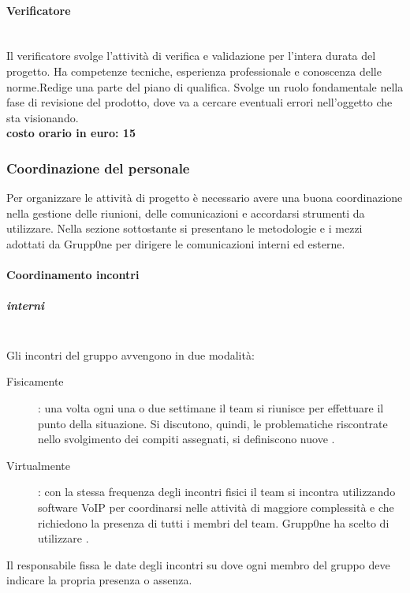 \documentclass[../norme-di-progetto.tex]{subfiles}
\begin{document}
\paragraph{Verificatore}%
\label{par:verificatore}
\\Il verificatore svolge l'attività di verifica e validazione per l'intera durata del progetto.
Ha competenze tecniche, esperienza professionale e conoscenza delle norme.Redige una parte del piano di qualifica.
Svolge un ruolo fondamentale nella fase di revisione del prodotto, dove va a cercare eventuali errori nell'oggetto che sta visionando.
\\\newline\textbf{costo orario in euro: 15}

\subsubsection{Coordinazione del personale}%
\label{subs:coordinazione del personale}
Per organizzare le attività di progetto è necessario avere una buona coordinazione nella gestione delle riunioni, delle comunicazioni e accordarsi strumenti da utilizzare.
Nella sezione sottostante si presentano le metodologie e i mezzi adottati da Grupp0ne per dirigere le comunicazioni interni ed esterne.

\paragraph{Coordinamento incontri}%
\label{par:coordinamento incontri}

\subparagraph{interni}%
\label{subp:coordinamento incontri/interni}
\\Gli incontri del gruppo avvengono in due modalità:
\begin{description}
  \item [Fisicamente]: una volta ogni una o due settimane il team si riunisce per effettuare il punto della situazione. Si discutono, quindi, le problematiche riscontrate nello svolgimento dei compiti assegnati, si definiscono nuove .
  \item [Virtualmente]: con la stessa frequenza degli incontri fisici il team si incontra utilizzando software VoIP per coordinarsi nelle attività di maggiore complessità e che richiedono la presenza di tutti i membri del team. Grupp0ne ha scelto di utilizzare .
\end{description}
Il responsabile fissa le date degli incontri su  dove ogni membro del gruppo deve indicare la propria presenza o assenza.
\end{document}
